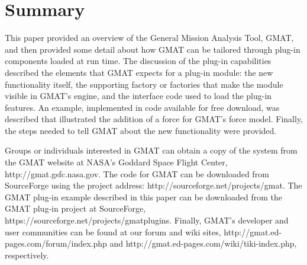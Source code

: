 \section{Summary}

This paper provided an overview of the General Mission Analysis Tool, GMAT, and
then provided some detail about how GMAT can be tailored through plug-in
components loaded at run time.  The discussion of the plug-in capabilities
described the elements that GMAT expects for a plug-in module: the new
functionality itself, the supporting factory or factories that make the module
visible in GMAT's engine, and the interface code used to load the plug-in
features.  An example, implemented in code available for free download, was
described that illustrated the addition of a force for GMAT's force model. 
Finally, the steps needed to tell GMAT about the new functionality were
provided.

Groups or individuals interested in GMAT can obtain a copy of the system from
the GMAT website at NASA's Goddard Space Flight Center,
http://gmat.gsfc.nasa.gov.  The code for GMAT can be downloaded from
SourceForge using the project address: http://sourceforge.net/projects/gmat. 
The GMAT plug-in example described in this paper can be downloaded from the
GMAT plug-in project at SourceForge,
https://sourceforge.net/projects/gmatplugins.  Finally, GMAT's developer and
user communities can be found at our forum and wiki sites,
http://gmat.ed-pages.com/forum/index.php and
http://gmat.ed-pages.com/wiki/tiki-index.php, respectively.